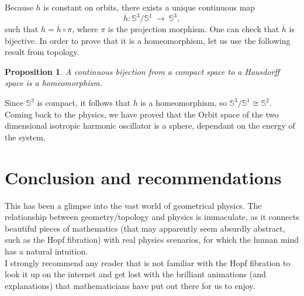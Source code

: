 \documentclass[12pt]{article}
\theoremstyle{plain}
\newtheorem{proposition}{Proposition}[section]
\newcommand{\Sp}{\mathbb{S}}
\begin{document}
Because $h$ is constant on orbits, there exists a unique continuous map $$\overline{h}\colon \Sp^3/\Sp^1\ \longrightarrow\ \Sp^3,$$ such that $h = \overline{h}\circ \pi$, where $\pi$ is the projection morphism. One can check that $\overline{h}$ is bijective. In order to prove that it is a homeomorphism, let us use the following result from topology.

\begin{proposition}
    A continuous bijection from a compact space to a Hausdorff space is a homeomorphism.
\end{proposition}

Since $\Sp^3$ is compact, it follows that $\overline{h}$ is a homeomorphism, so $\mathbf{\Sp}^3/\Sp^1 \cong \Sp^2$.\\

Coming back to the physics, we have proved that the Orbit space of the two dimensional isotropic harmonic oscillator is a sphere, dependant on the energy of the system.

\section{Conclusion and recommendations}

This has been a glimpse into the vast world of geometrical physics. The relationship between geometry/topology and physics is immaculate, as it connects beautiful pieces of mathematics (that may apparently seem absurdly abstract, such as the Hopf fibration) with real physics scenarios, for which the human mind has a natural intuition.\\

I strongly recommend any reader that is not familiar with the Hopf fibration to look it up on the internet and get lost with the brilliant animations (and explanations) that mathematicians have put out there for us to enjoy.



\end{document}
